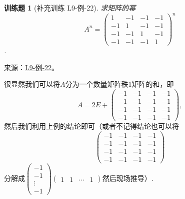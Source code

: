 \documentclass[UTF8,12pt,a4paper,fontset=fandol]{ctexart}
\newtheorem{exercise}{训练题}[section]
\begin{document}
\begin{exercise}[补充训练 L9-例-22]\label{prob:L9-例-22}
求矩阵的幂
\[A^n=\begin{pmatrix}
                      1  & -1 & -1 & -1 \\
                      -1 & 1  & -1 & -1 \\
                      -1 & -1 & 1  & -1 \\
                      -1 & -1 & -1 & 1
                  \end{pmatrix}^n\]
.
\end{exercise}
\noindent 来源：\href{https://github.com/yhwu-is/Linear-Algebra-Left-Undone/blob/new/%E8%AE%B2%E4%B9%89/%E4%B8%93%E9%A2%98/9%20%E7%9F%A9%E9%98%B5%E8%BF%90%E7%AE%97%E8%BF%9B%E9%98%B6.tex}{L9-例-22}。
\begin{solve}
很显然我们可以将$A$分为一个数量矩阵秩1矩阵的和，即\[A=2E+\begin{pmatrix}
                      -1 & -1 & -1 & -1 \\
                      -1 & -1 & -1 & -1 \\
                      -1 & -1 & -1 & -1 \\
                      -1 & -1 & -1 & -1
                  \end{pmatrix},\]
              然后我们利用上例的结论即可（或者不记得结论也可以将
\[\begin{pmatrix}
                      -1 & -1 & -1 & -1 \\
                      -1 & -1 & -1 & -1 \\
                      -1 & -1 & -1 & -1 \\
                      -1 & -1 & -1 & -1
                  \end{pmatrix}\]
分解成$\begin{pmatrix}
                      -1 \\ -1 \\ \vdots \\ -1
                  \end{pmatrix}\begin{pmatrix}
                      1 & 1 & \cdots & 1
                  \end{pmatrix}$然后现场推导）.
\end{solve}
\end{document}
